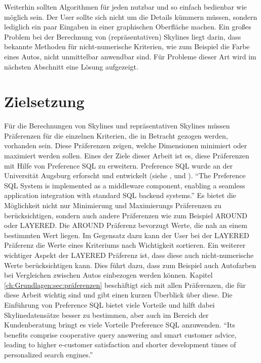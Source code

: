 Weiterhin sollten Algorithmen für jeden nutzbar und so einfach bedienbar wie möglich sein. Der User sollte sich nicht um die Details kümmern müssen, sondern lediglich ein paar Eingaben in einer graphischen Oberfläche machen. 
Ein großes Problem bei der Berechnung von (repräsentativen) Skylines liegt darin, dass bekannte Methoden für nicht-numerische Kriterien, wie zum Beispiel die Farbe eines Autos, nicht unmittelbar anwendbar sind. Für Probleme dieser Art wird im nächsten Abschnitt eine Lösung aufgezeigt.
\section{Zielsetzung}
\label{ch:Einleitung:sec:Zielsetzung}
Für die Berechnungen von Skylines und repräsentativen Skylines müssen Präferenzen für die einzelnen Kriterien, die in Betracht gezogen werden, vorhanden sein. Diese Präferenzen zeigen, welche Dimensionen minimiert oder maximiert werden sollen.
Eines der Ziele dieser Arbeit ist es, diese Präferenzen mit Hilfe von Preference SQL zu erweitern. Preference SQL wurde an der Universität Augsburg erforscht und entwickelt (siehe \cite{kiessling2011preference}, \cite{kiessling2002foundations} und \cite{kiessling2002preference}).
\enquote{The Preference SQL System is implemented as a middleware component, enabling a seamless application integration with standard SQL backend systems.} \cite[p. 1]{kiessling2011preference}
Es bietet die Möglichkeit nicht nur Minimierung und Maximierungs Präferenzen zu berücksichtigen, sondern auch andere Präferenzen wie zum Beispiel AROUND oder LAYERED. Die AROUND Präferenz bevorzugt Werte, die nah an einem bestimmten Wert liegen. Im Gegensatz dazu kann der User bei der LAYERED Präferenz die Werte eines Kriteriums nach Wichtigkeit sortieren. Ein weiterer wichtiger Aspekt der LAYERED Präferenz ist, dass diese auch nicht-numerische Werte berücksichtigen kann. Dies führt dazu, dass zum Beispiel auch Autofarben bei Vergleichen zwischen Autos einbezogen werden können. Kapitel \ref{ch:Grundlagen:sec:präferenzen} beschäftigt sich mit allen Präferenzen, die für diese Arbeit wichtig sind und gibt einen kurzen Überblick über diese.
Die Einführung von Preference SQL bietet viele Vorteile und hilft dabei Skylinedatensätze besser zu bestimmen, aber auch im Bereich der Kundenberatung bringt es viele Vorteile Preference SQL anzuwenden.
\enquote{Its benefits comprise cooperative query answering and smart customer advice, leading to higher e-customer satisfaction and shorter development times of personalized search engines.}\cite[p. 1]{kiessling2002preference}

